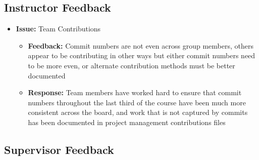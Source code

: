 \documentclass{article}
\begin{document}

\subsection{Instructor Feedback}

\begin{itemize}
    \item \textbf{Issue:} Team Contributions
    \begin{itemize}
        \item \textbf{Feedback:} Commit numbers are not even across group members, others appear to be contributing in other ways but either commit numbers need to be more even, or alternate contribution methods must be better documented
        \item \textbf{Response:} Team members have worked hard to ensure that commit numbers throughout the last third of the course have been much more consistent across the board, and work that is not captured by commits has been documented in project management contributions files
    \end{itemize}
\end{itemize}

\subsection{Supervisor Feedback}
\end{document}
